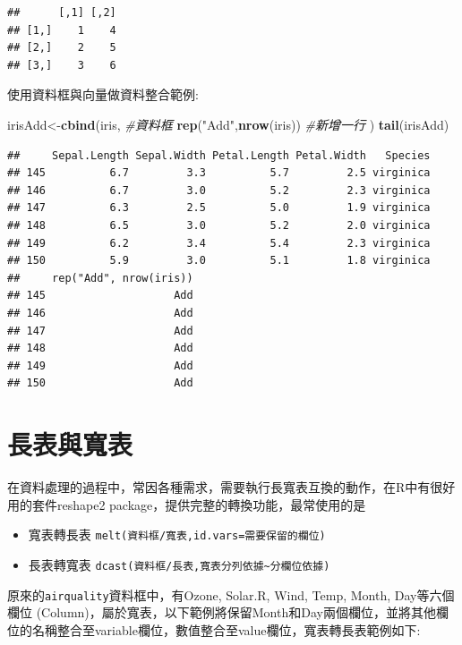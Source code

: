 \documentclass[]{book}
\newenvironment{Shaded}{\begin{snugshade}}{\end{snugshade}}
\newcommand{\KeywordTok}[1]{\textcolor[rgb]{0.13,0.29,0.53}{\textbf{{#1}}}}
\newcommand{\StringTok}[1]{\textcolor[rgb]{0.31,0.60,0.02}{{#1}}}
\newcommand{\CommentTok}[1]{\textcolor[rgb]{0.56,0.35,0.01}{\textit{{#1}}}}
\newcommand{\NormalTok}[1]{{#1}}
\providecommand{\tightlist}{%
  \setlength{\itemsep}{0pt}\setlength{\parskip}{0pt}}
\theoremstyle{definition}
\theoremstyle{definition}
\theoremstyle{remark}
\begin{document}
\begin{verbatim}
##      [,1] [,2]
## [1,]    1    4
## [2,]    2    5
## [3,]    3    6
\end{verbatim}

使用資料框與向量做資料整合範例:

\begin{Shaded}
\begin{Highlighting}[]
\NormalTok{irisAdd<-}\KeywordTok{cbind}\NormalTok{(iris, }\CommentTok{#資料框}
      \KeywordTok{rep}\NormalTok{(}\StringTok{"Add"}\NormalTok{,}\KeywordTok{nrow}\NormalTok{(iris))  }\CommentTok{#新增一行}
      \NormalTok{) }
\KeywordTok{tail}\NormalTok{(irisAdd)}
\end{Highlighting}
\end{Shaded}

\begin{verbatim}
##     Sepal.Length Sepal.Width Petal.Length Petal.Width   Species
## 145          6.7         3.3          5.7         2.5 virginica
## 146          6.7         3.0          5.2         2.3 virginica
## 147          6.3         2.5          5.0         1.9 virginica
## 148          6.5         3.0          5.2         2.0 virginica
## 149          6.2         3.4          5.4         2.3 virginica
## 150          5.9         3.0          5.1         1.8 virginica
##     rep("Add", nrow(iris))
## 145                    Add
## 146                    Add
## 147                    Add
## 148                    Add
## 149                    Add
## 150                    Add
\end{verbatim}

\section{長表與寬表}

在資料處理的過程中，常因各種需求，需要執行長寬表互換的動作，在R中有很好用的套件reshape2\citep{R-reshape2}
package，提供完整的轉換功能，最常使用的是

\begin{itemize}
\tightlist
\item
  寬表轉長表 \texttt{melt(資料框/寬表,id.vars=需要保留的欄位)}
\item
  長表轉寬表
  \texttt{dcast(資料框/長表,寬表分列依據\textasciitilde{}分欄位依據)}
\end{itemize}

原來的\texttt{airquality}資料框中，有Ozone, Solar.R, Wind, Temp, Month,
Day等六個欄位
(Column)，屬於寬表，以下範例將保留Month和Day兩個欄位，並將其他欄位的名稱整合至variable欄位，數值整合至value欄位，寬表轉長表範例如下:
\end{document}
